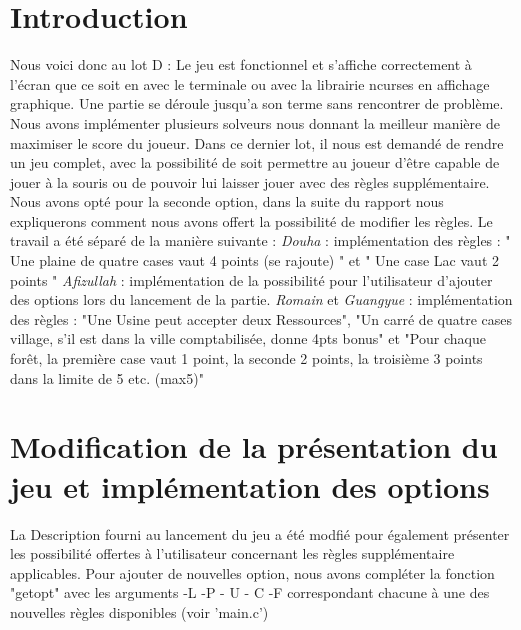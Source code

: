 \documentclass[10pt]{article}
\begin{document}
    \section{Introduction}
      Nous voici donc au lot D : Le jeu est fonctionnel et  s'affiche correctement à l'écran que ce soit en avec le terminale ou avec la librairie ncurses en affichage graphique.
      \newline Une partie se déroule jusqu'a son terme sans rencontrer de problème. Nous avons implémenter plusieurs solveurs nous donnant la meilleur manière de maximiser le score du joueur.
      \newline Dans ce dernier lot, il nous est demandé de rendre un jeu complet, avec la possibilité de soit permettre au joueur d'être capable de jouer à la souris ou de pouvoir lui laisser jouer avec des règles supplémentaire. 
      Nous avons opté pour la seconde option, dans la suite du rapport nous expliquerons comment nous avons offert la possibilité de modifier les règles.
      \newline Le travail a été séparé de la manière suivante :
      \newline
      \newline
      \textit{Douha} : implémentation des règles  : " Une plaine de quatre cases vaut 4 points (se rajoute) " et " Une case Lac vaut 2 points "
      \newline
      \newline
      \textit{Afizullah} : implémentation de la possibilité pour l'utilisateur d'ajouter des options lors du lancement de la partie.
      \newline
      \newline
      \textit{Romain} et \textit{Guangyue} :  implémentation des règles : "Une Usine peut accepter deux Ressources", "Un carré de quatre cases village, s’il est dans la ville comptabilisée, donne 4pts
  bonus" et "Pour chaque forêt, la première case vaut 1 point, la seconde 2 points, la troisième 3 points dans la limite de 5 etc.
  (max5)"
    \section{Modification de la présentation du jeu et implémentation des options}
      La Description fourni au lancement du jeu a été modfié pour également présenter les possibilité offertes à l'utilisateur concernant les règles supplémentaire applicables.
      \newline Pour ajouter de nouvelles option, nous avons compléter la fonction "getopt" avec les arguments -L -P - U - C -F correspondant chacune à une des nouvelles règles disponibles
      (voir 'main.c')
\end{document}
